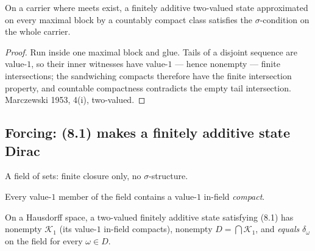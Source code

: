 \begin{theorem}
  \label{thm:compact-transport}
  \leanok
  On a carrier where meets exist, a finitely additive two-valued state
  approximated on every maximal block by a countably compact class satisfies the
  $\sigma$-condition on the whole carrier.
\end{theorem}

\begin{proof}
  \leanok
  Run inside one maximal block and glue. Tails of a disjoint sequence are
  value-$1$, so their inner witnesses have value-$1$ --- hence nonempty ---
  finite intersections; the sandwiching compacts therefore have the finite
  intersection property, and countable compactness contradicts the empty tail
  intersection. Marczewski 1953, 4(i), two-valued.
\end{proof}

\subsection{Forcing: (8.1) makes a finitely additive state Dirac}

\begin{definition}
  \label{def:set-field}
  \leanok
  A field of sets: finite closure only, no $\sigma$-structure.
\end{definition}

\begin{definition}
  \label{def:inner-regular-81}
  \leanok
  Every value-$1$ member of the field contains a value-$1$ in-field
  \emph{compact}.
\end{definition}

\begin{theorem}
  \label{thm:dirac-forcing}
  \leanok
  On a Hausdorff space, a two-valued finitely additive state satisfying (8.1)
  has nonempty $\mathcal{K}_1$ (its value-$1$ in-field compacts), nonempty
  $D = \bigcap \mathcal{K}_1$, and \emph{equals} $\delta_\omega$ on the field
  for every $\omega \in D$.
\end{theorem}

